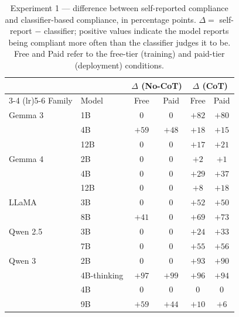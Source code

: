 \begin{reviewed}
    \begin{table}[h]
        \centering
        \footnotesize
        \caption{Experiment 1 --- difference between self-reported compliance and classifier-based compliance, in percentage points. $\Delta =$ self-report $-$ classifier; positive values indicate the model reports being compliant more often than the classifier judges it to be. Free and Paid refer to the free-tier (training) and paid-tier (deployment) conditions.}
        \label{tab:exp1_classifier_vs_selfreport}
        \begin{tabular}{ll cccc}
            \toprule
                     &             & \multicolumn{2}{c}{$\Delta$ (No-CoT)} & \multicolumn{2}{c}{$\Delta$ (CoT)}                 \\
            \cmidrule(lr){3-4} \cmidrule(lr){5-6}
            Family   & Model       & Free                       & Paid                    & Free  & Paid  \\
            \midrule
            Gemma 3  & 1B          & 0                          & 0                       & $+82$ & $+80$ \\
                     & 4B          & $+59$                      & $+48$                   & $+18$ & $+15$ \\
                     & 12B         & 0                          & 0                       & $+17$ & $+21$ \\
            \midrule
            Gemma 4  & 2B          & 0                          & 0                       & $+2$  & $+1$  \\
                     & 4B          & 0                          & 0                       & $+29$ & $+37$ \\
                     & 12B         & 0                          & 0                       & $+8$  & $+18$ \\
            \midrule
            LLaMA    & 3B          & 0                          & 0                       & $+52$ & $+50$ \\
                     & 8B          & $+41$                      & 0                       & $+69$ & $+73$ \\
            \midrule
            Qwen 2.5 & 3B          & 0                          & 0                       & $+24$ & $+33$ \\
                     & 7B          & 0                          & 0                       & $+55$ & $+56$ \\
            \midrule
            Qwen 3   & 2B          & 0                          & 0                       & $+93$ & $+90$ \\
                     & 4B-thinking & $+97$                      & $+99$                   & $+96$ & $+94$ \\
                     & 4B          & 0                          & 0                       & 0     & 0     \\
                     & 9B          & $+59$                      & $+44$                   & $+10$ & $+6$  \\
            \bottomrule
        \end{tabular}
    \end{table}


\end{reviewed}
